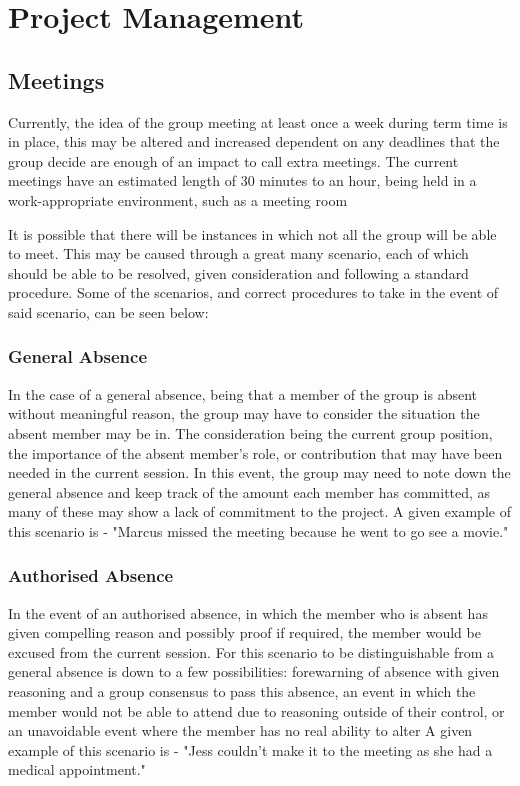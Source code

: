 \documentclass[11pt]{report}
\begin{document}
\section{Project Management}

\subsection{Meetings}
Currently, the idea of the group meeting at least once a week during term time is in place, this may be altered and increased dependent on any deadlines that the group decide are enough of an impact to call extra meetings. The current meetings have an estimated length of 30 minutes to an hour, being held in a work-appropriate environment, such as a meeting room

It is possible that there will be instances in which not all the group will be able to meet. This may be caused through a great many scenario, each of which should be able to be resolved, given consideration and following a standard procedure. Some of the scenarios, and correct procedures to take in the event of said scenario, can be seen below:

\subsubsection{General Absence}
In the case of a general absence, being that a member of the group is absent without meaningful reason, the group may have to consider the situation the absent member may be in. The consideration being the current group position, the importance of the absent member's role, or contribution that may have been needed in the current session. In this event, the group may need to note down the general absence and keep track of the amount each member has committed, as many of these may show a lack of commitment to the project.
A given example of this scenario is - "Marcus missed the meeting because he went to go see a movie."

\subsubsection{Authorised Absence}
In the event of an authorised absence, in which the member who is absent has given compelling reason and possibly proof if required, the member would be excused from the current session. For this scenario to be distinguishable from a general absence is down to a few possibilities: forewarning of absence with given reasoning and a group consensus to pass this absence, an event in which the member would not be able to attend due to reasoning outside of their control, or an unavoidable event where the member has no real ability to alter
A given example of this scenario is - "Jess couldn't make it to the meeting as she had a medical appointment."
\end{document}
